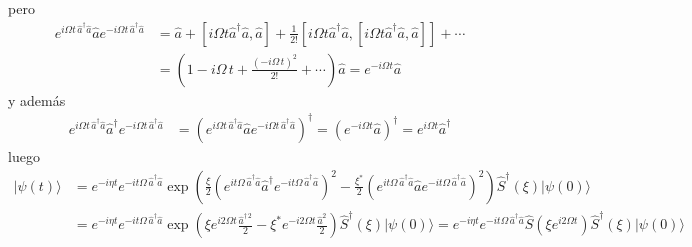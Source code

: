 pero
\begin{align*}
	e^{i\Omega t \,\hat{a}^{\dagger}\hat{a}}\hat{a} e^{-i\Omega t \,\hat{a}^{\dagger}\hat{a}} & = \hat{a} + \left[i\Omega t\hat{a}^{\dagger}\hat{a},\hat{a}\right] + \frac{1}{2!} \left[i\Omega t\hat{a}^{\dagger}\hat{a},\left[i\Omega t\hat{a}^{\dagger}\hat{a},\hat{a}\right]\right]+\cdots \\
	                                                                                          & = \left(1-i\Omega\,t+\frac{(-i\Omega\,t)^{2}}{2!}+\cdots\right)\hat{a} = e^{-i\Omega t} \hat{a}
\end{align*}
y además
\begin{align*}
	e^{i\Omega t \,\hat{a}^{\dagger}\hat{a}}\hat{a}^{\dagger} e^{-i\Omega t \,\hat{a}^{\dagger}\hat{a}} & = \left(e^{i\Omega t \,\hat{a}^{\dagger}\hat{a}}\hat{a} e^{-i\Omega t \,\hat{a}^{\dagger}\hat{a}}\right)^{\dagger} = \left(e^{-i\Omega t}\hat{a}\right)^{\dagger} = e^{i\Omega t}\hat{a}^{\dagger}
\end{align*}
luego
\begin{align*}
	\vert \psi(t) \rangle & = e^{-i\eta t} e^{-it \Omega \,\hat{a}^{\dagger}\hat{a}}  \exp\left(\frac{\xi}{2}\left(e^{it \Omega \,\hat{a}^{\dagger}\hat{a}}\hat{a}^{\dagger}e^{-it \Omega \,\hat{a}^{\dagger}\hat{a}}\right)^{2} - \frac{\xi^{*}}{2}\left(e^{it \Omega \,\hat{a}^{\dagger}\hat{a}} \hat{a} e^{-it \Omega \,\hat{a}^{\dagger}\hat{a}}\right)^{2} \right)  \hat{S}^{\dagger}(\xi)\vert \psi(0)\rangle \\
	                      & = e^{-i\eta t} e^{-it \Omega \,\hat{a}^{\dagger}\hat{a}}  \exp\left(\xi e^{i2\Omega t} \frac{\hat{a}^{\dagger\,2}}{2} - \xi^{*} e^{-i2\Omega t} \frac{\hat{a}^{2}}{2}  \right)  \hat{S}^{\dagger}(\xi)\vert \psi(0)\rangle = e^{-i\eta t} e^{-it \Omega \,\hat{a}^{\dagger}\hat{a}} \hat{S}\left(\xi e^{i2\Omega t} \right)  \hat{S}^{\dagger}(\xi)\vert \psi(0)\rangle
\end{align*}
